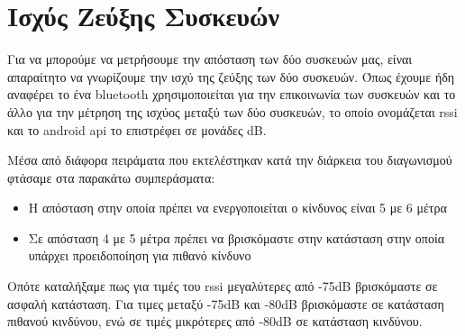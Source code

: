 \section{Ισχύς Ζεύξης Συσκευών}

\par Για να μπορούμε να μετρήσουμε την απόσταση των δύο συσκευών μας, είναι 
απαραίτητο να γνωρίζουμε την ισχύ της ζεύξης των δύο συσκευών. Όπως έχουμε 
ήδη αναφέρει το ένα bluetooth χρησιμοποιείται για την επικοινωνία των συσκευών και 
το άλλο για την μέτρηση της ισχύος μεταξύ των δύο συσκευών, το οποίο ονομάζεται 
rssi και το android api το επιστρέφει σε μονάδες dB. 


\par Μέσα από διάφορα πειράματα που εκτελέστηκαν κατά την διάρκεια του διαγωνισμού 
φτάσαμε στα παρακάτω συμπεράσματα:
\begin{itemize}
\item Η απόσταση στην οποία πρέπει να ενεργοποιείται ο κίνδυνος είναι 5 με 6  
μέτρα
\item Σε απόσταση 4 με 5 μέτρα πρέπει να βρισκόμαστε στην κατάσταση στην οποία 
υπάρχει προειδοποίηση για πιθανό κίνδυνο
\end{itemize}   

\par Οπότε καταλήξαμε πως για τιμές του rssi μεγαλύτερες από -75dB βρισκόμαστε σε 
ασφαλή κατάσταση. Για τιμες μεταξύ -75dB και -80dB βρισκόμαστε σε κατάσταση πιθανού 
κινδύνου, ενώ σε τιμές μικρότερες από -80dB σε κατάσταση κινδύνου.
